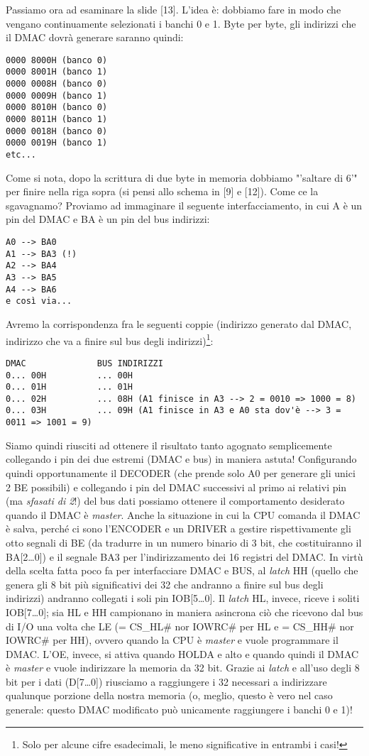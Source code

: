 Passiamo ora ad esaminare la slide [13]. L'idea è: dobbiamo fare in modo che vengano continuamente selezionati i banchi 0 e 1. Byte per byte, gli indirizzi che il DMAC dovrà generare saranno quindi:
\begin{verbatim}
0000 8000H (banco 0)
0000 8001H (banco 1)
0000 0008H (banco 0)
0000 0009H (banco 1)
0000 8010H (banco 0)
0000 8011H (banco 1)
0000 0018H (banco 0)
0000 0019H (banco 1)
etc...
\end{verbatim}
Come si nota, dopo la scrittura di due byte in memoria dobbiamo "'saltare di 6'" per finire nella riga sopra (si pensi allo schema in [9] e [12]). Come ce la sgavagnamo? Proviamo ad immaginare il seguente interfacciamento, in cui A è un pin del DMAC e BA è un pin del bus indirizzi:
\begin{verbatim}
A0 --> BA0
A1 --> BA3 (!)
A2 --> BA4
A3 --> BA5
A4 --> BA6
e così via...
\end{verbatim}
Avremo la corrispondenza fra le seguenti coppie (indirizzo generato dal DMAC, indirizzo che va a finire sul bus degli indirizzi)\footnote{Solo per alcune cifre esadecimali, le meno significative in entrambi i casi!}:
\begin{verbatim}
DMAC              BUS INDIRIZZI
0... 00H          ... 00H
0... 01H          ... 01H
0... 02H          ... 08H (A1 finisce in A3 --> 2 = 0010 => 1000 = 8)
0... 03H          ... 09H (A1 finisce in A3 e A0 sta dov'è --> 3 = 0011 => 1001 = 9)
\end{verbatim}
Siamo quindi riusciti ad ottenere il risultato tanto agognato semplicemente collegando i pin dei due estremi (DMAC e bus) in maniera astuta!
Configurando quindi opportunamente il DECODER (che prende solo A0 per generare gli unici 2 BE possibili) e collegando i pin del DMAC successivi al primo ai relativi pin (ma \emph{sfasati di 2}!) del bus dati possiamo ottenere il comportamento desiderato quando il DMAC è \textit{master}. Anche la situazione in cui la CPU comanda il DMAC è salva, perché ci sono l'ENCODER e un DRIVER a gestire rispettivamente gli otto segnali di BE (da tradurre in un numero binario di 3 bit, che costituiranno il BA[2\ldots 0]) e il segnale BA3 per l'indirizzamento dei 16 registri del DMAC.
In virtù della scelta fatta poco fa per interfacciare DMAC e BUS, al \textit{latch} HH (quello che genera gli 8 bit più significativi dei 32 che andranno a finire sul bus degli indirizzi) andranno collegati i soli pin IOB[5\ldots 0]. Il \textit{latch} HL, invece, riceve i soliti IOB[7\ldots 0]; sia HL e HH campionano in maniera asincrona ciò che ricevono dal bus di I/O una volta che LE (= CS\_HL\# nor IOWRC\# per HL e = CS\_HH\# nor IOWRC\# per HH), ovvero quando la CPU è \textit{master} e vuole programmare il DMAC. L'OE, invece, si attiva quando HOLDA e alto e quando quindi il DMAC è \textit{master} e vuole indirizzare la memoria da 32 bit.
Grazie ai \textit{latch} e all'uso degli 8 bit per i dati (D[7\ldots 0]) riusciamo a raggiungere i 32 necessari a indirizzare qualunque porzione della nostra memoria (o, meglio, questo è vero nel caso generale: questo DMAC modificato può unicamente raggiungere i banchi 0 e 1)!

